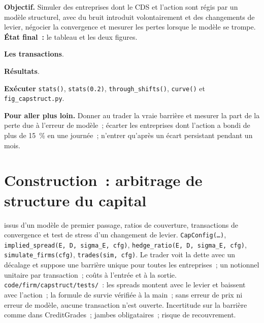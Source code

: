 \begin{tutorial}
\textbf{Objectif.} Simuler des entreprises dont le CDS et l'action sont régis par un modèle structurel, avec du bruit introduit volontairement et des changements de levier, négocier la convergence et mesurer
les pertes lorsque le modèle se trompe. \textbf{État final~:} le tableau et les deux figures.
\begin{tutsteps}
\item \textbf{Les transactions}.
\label{lst:s2:capital-structure-arbitrage:trades}
\item \textbf{Résultats}.
\label{lst:s2:capital-structure-arbitrage:stats}
\item \textbf{Exécuter} \texttt{stats()}, \texttt{stats(0.2)}, \texttt{through\_shifts()}, \texttt{curve()} et \texttt{fig\_capstruct.py}.
\end{tutsteps}
\textbf{Pour aller plus loin.} Donner au trader la vraie barrière et mesurer la part de la perte due à l'erreur de modèle~; écarter les entreprises dont l'action a bondi de plus de
15~\% en une journée~; n'entrer qu'après un écart persistant pendant un mois.
\end{tutorial}

\section{Construction~: arbitrage de structure du capital}\label{bld:s2:capital-structure-arbitrage:capstruct}

\begin{build}
  issus d'un modèle de premier passage, ratios de couverture, transactions de convergence et test de stress d'un changement de levier.
 \texttt{CapConfig(\dots)}, \texttt{implied\_spread(E, D, sigma\_E, cfg)}, \texttt{hedge\_ratio(E, D, sigma\_E, cfg)},
\texttt{simulate\_firms(cfg)}, \texttt{trades(sim, cfg)}.
 Le trader voit la dette avec un décalage et suppose une barrière unique pour toutes les entreprises~; un notionnel unitaire par transaction~; coûts à l'entrée et à la sortie.
 \texttt{code/firm/capstruct/tests/}~: les spreads montent avec le levier et baissent avec l'action~; la formule de survie vérifiée à la main~; sans
erreur de prix ni erreur de modèle, aucune transaction n'est ouverte.
 Incertitude sur la barrière comme dans CreditGrades~; jambes obligataires~; risque de recouvrement.
\end{build}

